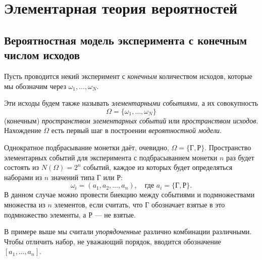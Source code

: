 \chapter{Элементарная теория вероятностей}
\section{Вероятностная модель эксперимента с конечным числом исходов}
Пусть проводится некий эксперимент с \emph{конечным} количеством исходов,
которые мы обозначим через $ \omega_1, \dots, \omega_N $.

Эти исходы будем также называть \emph{элементарными событиями}, а их
совокупность  
\[
	\Omega = \{ \omega_1, \dots , \omega_N\}
\]
(конечным) \emph{пространством элементарных событий} или \emph{пространством
исходов}.
Нахождение $ \Omega $ есть первый шаг в построении \emph{вероятностной модели}.
\begin{ex} 
	Однократное подбрасывание монетки даёт, очевидно, $ \Omega = \{\text{Г}, \text{Р}\} $.
	Пространство элементарных событий для эксперимента с подбрасыванием монетки
	$n$ раз будет состоять из $ N(\Omega) = 2^n$ событий, каждое из которых будет определяться
наборами из $n$ значений типа Г или Р:
\[
	\omega_i = (a_1, a_2, \dots , a_n), \quad \text{где } a_i = \{ \text{Г},
	\text{Р} \}.
\]
В данном случае можно провести биекцию между событиями и подмножествами множества из $ n $
элементов, если считать, что Г обозначает взятые в это подмножество элементы, а
Р --- не взятые.
\end{ex}

В примере выше мы считали \emph{упорядоченные} различно комбинации различными.
Чтобы отличить набор, не уважающий порядок, вводится обозначение $
[a_1,\ldots,a_n] $.

